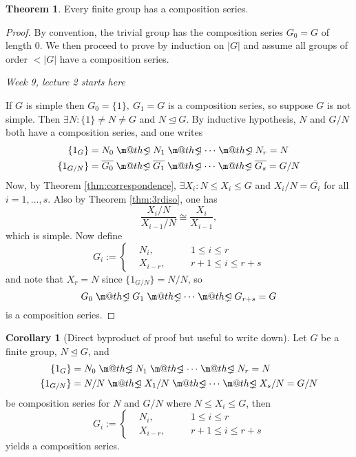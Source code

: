 \documentclass[a4paper]{article}
\makeatletter
\DeclareRobustCommand{\pns}{\mathrel{\text{$\m@th\proper@ideal$}}}
\newcommand{\proper@ideal}{%
  \ooalign{$\lneq$\cr\raise.22ex\hbox{$\lhd$}\cr}%
}
\theoremstyle{definition}
\newtheorem{thm}[defn]{Theorem}
\newtheorem{coro}[defn]{Corollary}
\makeatother
\begin{document}
\begin{thm}
\label{thm:everyfingphasacompnseries}
Every finite group has a composition series.
\end{thm}
\begin{proof}
By convention, the trivial group has the composition series $G_0=G$ of length 0. We then proceed to prove by induction on $|G|$ and assume all groups of order $<|G|$ have a composition series.

\begin{flushright}
\textit{Week 9, lecture 2 starts here}
\end{flushright}

If $G$ is simple then $G_0=\{1\},\ G_1=G$ is a composition series, so suppose $G$ is not simple. Then $\exists N: \{1\}\neq N\neq G$ and $N\unlhd G$. By inductive hypothesis, $N$ and $G/N$ both have a composition series, and one writes
\[
\begin{aligned}
\{1_G\}&=N_0\pns N_1\pns \cdots\pns N_r=N \\
\{1_{G/N}\}&=\overline{G_0}\pns\overline{G_1}\pns\cdots\pns\overline{G_s}=G/N
\end{aligned}
\]
Now, by Theorem \ref{thm:correspondence}, $\exists X_i:N\leq X_i\leq G$ and $X_i/N=\overline{G_i}$ for all $i=1,\ldots,s$. Also by Theorem \ref{thm:3rdiso}, one has
\[
\frac{X_i/N}{X_{i-1}/N}\cong \frac{X_i}{X_{i-1}},
\]
which is simple. Now define
\[
G_i:=\left\{ \begin{aligned}
& N_i,\quad && 1\leq i\leq r \\
& X_{i-r},\quad && r+1\leq i \leq r+s
\end{aligned} \right.
\]
and note that $X_r=N$ since $\{1_{G/N}\}=N/N$, so
\[
G_0\pns G_1\pns\cdots\pns G_{r+s}=G
\]
is a composition series.
\end{proof}

\begin{coro}[Direct byproduct of proof but useful to write down]
\label{coro:adjoinseriesofnormalandquotient}
Let $G$ be a finite group, $N\unlhd G$, and
\[
\begin{aligned}
\{1_G\}&=N_0\pns N_1\pns\cdots\pns N_r=N \\
\{1_{G/N}\}&=N/N\pns X_1/N\pns\cdots\pns X_s/N=G/N
\end{aligned}
\]
be composition series for $N$ and $G/N$ where $N\leq X_i\leq G$, then
\[
G_i:=\left\{ \begin{aligned}
&N_i,\quad &&1\leq i\leq r \\
&X_{i-r},\quad &&r+1\leq i \leq r+s
\end{aligned} \right.
\]
yields a composition series.
\end{coro}
\end{document}
